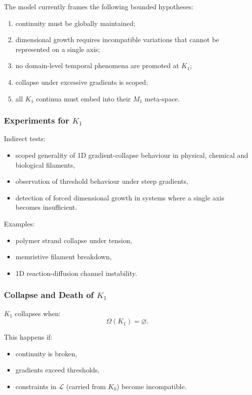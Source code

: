 The model currently frames the following bounded hypotheses: \begin{enumerate}
    \item continuity must be globally maintained;
    \item dimensional growth requires incompatible variations that cannot
          be represented on a single axis;
    \item no domain-level temporal phenomena are promoted at $K_1$;
    \item collapse under excessive gradients is scoped;
    \item all $K_1$ continua must embed into their $M_1$ meta-space.
\end{enumerate}

\subsubsection{Experiments for \texorpdfstring{$K_1$}{K_1}}

Indirect tests:
\begin{itemize}
    \item scoped generality of 1D gradient-collapse behaviour in physical,
          chemical and biological filaments,
    \item observation of threshold behaviour under steep gradients,
    \item detection of forced dimensional growth in systems where a
          single axis becomes insufficient.
\end{itemize}

Examples:
\begin{itemize}
    \item polymer strand collapse under tension,
    \item memristive filament breakdown,
    \item 1D reaction-diffusion channel instability.
\end{itemize}

\subsubsection{Collapse and Death of \texorpdfstring{$K_1$}{K_1}}

$K_1$ collapses when:
\[
\Omega(K_1) = \varnothing.
\]

This happens if:
\begin{itemize}
    \item continuity is broken,
    \item gradients exceed thresholds,
    \item constraints in $\mathcal{L}$ (carried from $K_0$) become
          incompatible.
\end{itemize}


